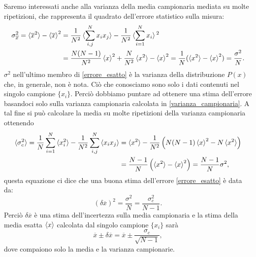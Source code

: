 \documentclass[LaM]{sapthesis}
\begin{document}
	Saremo interessati anche alla varianza della media campionaria mediata su molte ripetizioni, che rappresenta il quadrato dell'errore statistico sulla misura:
	\begin{equation}\begin{split}\label{errore_esatto}
			\sigma^2_{\overline{x}} = \braket{\overline{x}^2}-\braket{\overline{x}}^2 &= \frac{1}{N^2}\braket{\sum_{i,j}^{N}x_i x_j} - \frac{1}{N^2}\braket{\sum_{i=1}^{N}x_i}{}^2		 \\&=\frac{N(N-1)}{N^2}\braket{x}^2 + \frac{N}{N^2}\braket{x^2}-\braket{x}^2=\frac{1}{N}(\braket{x^2}-\braket{x}^2)=\frac{\sigma^2}{N}.
	\end{split}
	 \end{equation}
	  $\sigma^2$ nell'ultimo membro di \eqref{errore_esatto} è la varianza della distribuzione $P(x)$ che, in generale, non è nota. Ciò che conosciamo sono solo i dati contenuti nel singolo campione $\{x_i\}$. Perciò dobbiamo puntare ad ottenere una stima dell'errore basandoci solo sulla varianza campionaria calcolata in \eqref{varianza_campionaria}. A tal fine si può calcolare la media su molte ripetizioni della varianza campionaria ottenendo
	 \begin{equation}\begin{split}
	 \braket{\sigma^2_c}=\frac{1}{N}\sum_{i=1}^{N}\braket{x_i^2}-\frac{1}{N^2}\sum_{i,j}^{N}\braket{x_i x_j}&=\braket{x^2}-\frac{1}{N^2}\left(N(N-1)\braket{x}^2-N\braket{x^2}\right)\\&=\frac{N-1}{N}\left(\braket{x^2}-\braket{x}^2\right)=\frac{N-1}{N}\sigma^2,
	 \end{split}\end{equation}
	 questa equazione ci dice che una buona stima dell'errore \eqref{errore_esatto} è data da:
	 \begin{equation}\label{stima_errore}
	 	(\delta\overline{x})^2=\frac{\sigma^2}{N}=\frac{\sigma^2_c}{N-1}.
	 \end{equation}
	 Perciò $\delta\overline{x}$ è una stima dell'incertezza sulla media campionaria e la stima della media esatta $\braket{x}$ calcolata dal singolo campione $\{x_i\}$ sarà
	 \begin{equation}
	 	\overline{x}\pm\delta\overline{x}=\overline{x}\pm\frac{\sigma_c}{\sqrt{N-1}},
	 \end{equation}
	 dove compaiono solo la media e la varianza campionarie.
	 
\end{document}
